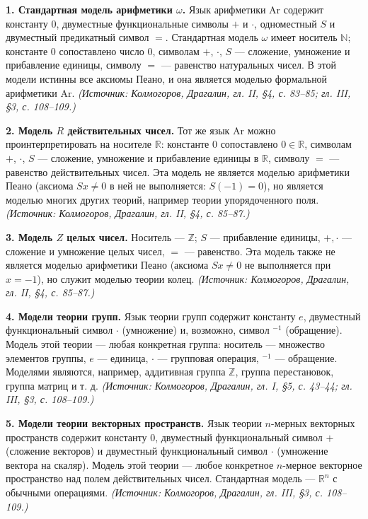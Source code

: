 \documentclass[a4paper,12pt]{article}
\begin{document}
\textbf{1. Стандартная модель арифметики \(\omega\).} Язык арифметики \(\mathrm{Ar}\) содержит константу \(0\), двуместные функциональные символы \(+\) и \(\cdot\), одноместный \(S\) и двуместный предикатный символ \(=\). Стандартная модель \(\omega\) имеет носитель \(\mathbb{N}\); константе \(0\) сопоставлено число \(0\), символам \(+\), \(\cdot\), \(S\) --- сложение, умножение и прибавление единицы, символу \(=\) --- равенство натуральных чисел. В этой модели истинны все аксиомы Пеано, и она является моделью формальной арифметики \(\mathrm{Ar}\).
\textit{(Источник: Колмогоров, Драгалин, гл. II, §4, с. 83--85; гл. III, §3, с. 108--109.)}

\textbf{2. Модель \(R\) действительных чисел.} Тот же язык \(\mathrm{Ar}\) можно проинтерпретировать на носителе \(\mathbb{R}\): константе \(0\) сопоставлено \(0\in\mathbb{R}\), символам \(+\), \(\cdot\), \(S\) --- сложение, умножение и прибавление единицы в \(\mathbb{R}\), символу \(=\) --- равенство действительных чисел. Эта модель не является моделью арифметики Пеано (аксиома \(Sx\neq 0\) в ней не выполняется: \(S(-1)=0\)), но является моделью многих других теорий, например теории упорядоченного поля.
\textit{(Источник: Колмогоров, Драгалин, гл. II, §4, с. 85--87.)}

\textbf{3. Модель \(Z\) целых чисел.} Носитель --- \(\mathbb{Z}\); \(S\) --- прибавление единицы, \(+,\cdot\) --- сложение и умножение целых чисел, \(=\) --- равенство. Эта модель также не является моделью арифметики Пеано (аксиома \(Sx\neq 0\) не выполняется при \(x=-1\)), но служит моделью теории колец.
\textit{(Источник: Колмогоров, Драгалин, гл. II, §4, с. 85--87.)}

\textbf{4. Модели теории групп.} Язык теории групп содержит константу \(e\), двуместный функциональный символ \(\cdot\) (умножение) и, возможно, символ \({}^{-1}\) (обращение). Модель этой теории --- любая конкретная группа: носитель --- множество элементов группы, \(e\) --- единица, \(\cdot\) --- групповая операция, \({}^{-1}\) --- обращение. Моделями являются, например, аддитивная группа \(\mathbb{Z}\), группа перестановок, группа матриц и т. д.
\textit{(Источник: Колмогоров, Драгалин, гл. I, §5, с. 43--44; гл. III, §3, с. 108--109.)}

\textbf{5. Модели теории векторных пространств.} Язык теории \(n\)-мерных векторных пространств содержит константу \(0\), двуместный функциональный символ \(+\) (сложение векторов) и двуместный функциональный символ \(\cdot\) (умножение вектора на скаляр). Модель этой теории --- любое конкретное \(n\)-мерное векторное пространство над полем действительных чисел. Стандартная модель --- \(\mathbb{R}^n\) с обычными операциями.
\textit{(Источник: Колмогоров, Драгалин, гл. III, §3, с. 108--109.)}
\end{document}
